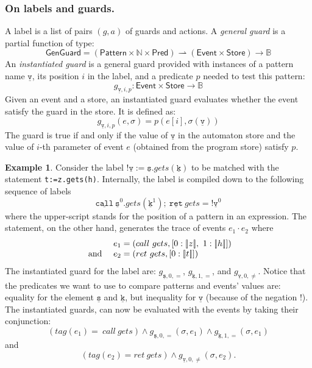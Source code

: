 \documentclass[9pt, preprint]{sigplanconf} %
\newcommand{\noterg}[2]{\textcolor{gray}{[\textcolor{red}{#1}: #2]}}
\newcommand{\rlp}[1]{\noterg{rlp}{#1}}
\newcommand{\B}{\ensuremath{\mathbb{B}}}
\newcommand{\N}{\ensuremath{\mathbb{N}}}
\newcommand{\pattern}[1]{\ensuremath{\mathtt{\underline{#1}}}}
\newcommand{\pmap}{\rightharpoonup}
\newcommand{\set}[1]{\ensuremath{\mathsf{#1}}}
\theoremstyle{definition}
\newtheorem{example}{Example}
\theoremstyle{remark}
\begin{document}
\subsubsection{On labels and guards.} %

A label is a list of pairs $(g,a)$ of guards and actions. A  {\em general guard} is a partial function of type:
\[
\set{GenGuard} = (\set{Pattern} \times \N \times \set{Pred}) \pmap (\set{Event}\times\set{Store}) \to \B
\]
An {\em instantiated guard} is a general guard provided with instances of a pattern  name $\pattern v$,  its position $i$ in the label, and a predicate $p$ needed to test this pattern:
\[
g_{\pattern{v},i,p} : \set{Event}\times\set{Store} \to \B
\]
Given an event and a store, an instantiated guard  evaluates whether the event satisfy the guard in the store. It is defined as:
\newcommand{\sem}[1]{[ \! | #1 | \! ]}
\[
g_{\pattern{v},i,p}(e, \sigma) = p(e[i],\sigma(\pattern v))
\] The guard is true if and only if the value of $\pattern{v}$ in the automaton store
and the value of $i$-th parameter of  event $e$ (obtained from the program store) satisfy $p$.
\begin{example}
Consider the label
 $ !\pattern {v} := \pattern {s}.gets(\pattern {k})$ to be matched with the statement
 {\tt t:=z.gets(h)}. Internally,  the label is compiled down to the
 following sequence of labels
\[
\pattern{call} \  \pattern{s}^0 .gets(\pattern {k}^1);  \ \pattern{ret} \ gets = ! \pattern {v}^0
\] where the upper-script stands for the position of a pattern in an
expression.
The statement, on the other hand, generates the trace of events $e_1 \cdot e_2$ where
\[
\begin{array}{l l}
 & e_1=(call \ gets, [0: \sem{z}, \ 1: \sem{h}])  \\
 \mbox{ and }  &  e_2= (ret \ gets, [0: \sem{t}]) 
\end{array}
\]
The instantiated guard for the label are:
 $g_{\pattern{s},0,=}$, $g_{\pattern{k},1,=}$, and  $g_{\pattern{v},0, \neq}$.
Notice that the predicates we want to use to compare patterns and events' values are: equality for the element $\pattern{s}$ and $\pattern{k}$,
but inequality for \pattern{v} (because of the negation $!$).
The instantiated guards, can now be evaluated with the events by taking their conjunction:
\[
 (tag(e_1)= \ call \ gets) \wedge g_{\pattern{s},0,=}(\sigma,e_1) \wedge g_{\pattern{k},1,=}(\sigma, e_1)
\] and
\[
 (tag(e_2)= ret \ gets) \wedge g_{\pattern{v},0,\neq}(\sigma,e_2).
\]
\end{example}
\end{document}
